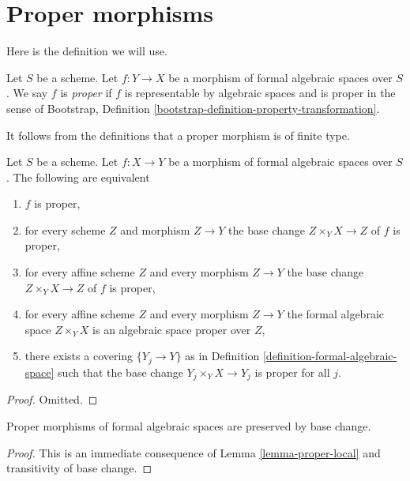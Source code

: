 \section{Proper morphisms}
\label{section-proper}

\noindent
Here is the definition we will use.

\begin{definition}
\label{definition-proper}
Let $S$ be a scheme. Let $f : Y \to X$ be a morphism of formal algebraic
spaces over $S$. We say $f$ is {\it proper}
if $f$ is representable by algebraic spaces and is proper in the sense of
Bootstrap, Definition \ref{bootstrap-definition-property-transformation}.
\end{definition}

\noindent
It follows from the definitions that a proper morphism is of finite type.

\begin{lemma}
\label{lemma-proper-local}
Let $S$ be a scheme. Let $f : X \to Y$ be a morphism of formal algebraic spaces
over $S$. The following are equivalent
\begin{enumerate}
\item $f$ is proper,
\item for every scheme $Z$ and morphism $Z \to Y$ the
base change $Z \times_Y X \to Z$ of $f$ is proper,
\item for every affine scheme $Z$ and every morphism $Z \to Y$ the
base change $Z \times_Y X \to Z$ of $f$ is proper,
\item for every affine scheme $Z$ and every morphism $Z \to Y$ the
formal algebraic space $Z \times_Y X$ is an algebraic space proper over $Z$,
\item there exists a covering $\{Y_j \to Y\}$ as in
Definition \ref{definition-formal-algebraic-space}
such that the base change $Y_j \times_Y X \to Y_j$ is proper for all $j$.
\end{enumerate}
\end{lemma}

\begin{proof}
Omitted.
\end{proof}

\begin{lemma}
\label{lemma-base-change-proper}
Proper morphisms of formal algebraic spaces are preserved by base change.
\end{lemma}

\begin{proof}
This is an immediate consequence of Lemma \ref{lemma-proper-local}
and transitivity of base change.
\end{proof}







